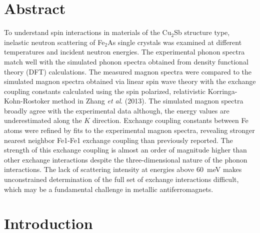 \documentclass[10pt,doublespacing,edeposit]{uiucthesis2020}
\begin{document}
\begin{mainmatter}
\section{Abstract}
To understand spin interactions in materials of the Cu$_2$Sb structure type, inelastic neutron scattering of Fe$_2$As single crystals was examined at different temperatures and incident neutron energies. The experimental phonon spectra match well with the simulated phonon spectra obtained from density functional theory (DFT) calculations. The measured magnon spectra were compared to the simulated magnon spectra obtained via linear spin wave theory with the exchange coupling constants calculated using the spin polarized, relativistic Korringa-Kohn-Rostoker method in Zhang \emph{et al}. (2013). The simulated magnon spectra broadly agree with the experimental data although, the energy values are underestimated along the $K$ direction. Exchange coupling constants between Fe atoms were refined by fits to the experimental magnon spectra, revealing stronger nearest neighbor Fe1-Fe1 exchange coupling than previously reported. The strength of this exchange coupling is almost an order of magnitude higher than other exchange interactions despite the three-dimensional nature of the phonon interactions. The lack of scattering intensity at energies above 60~meV makes unconstrained determination of the full set of exchange interactions difficult, which may be a fundamental challenge in metallic antiferromagnets.




\section{Introduction} 


\end{mainmatter}
\end{document}
